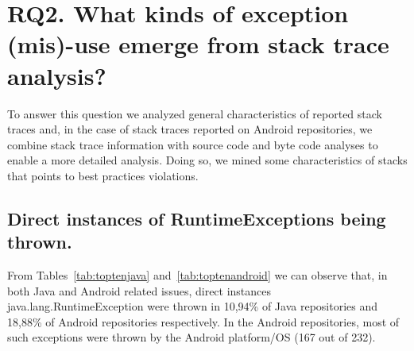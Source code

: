 \documentclass[conference]{IEEEtran}
\begin{document}


\section{RQ2.  What kinds of exception (mis)-use emerge from stack trace analysis? }

To answer this question we analyzed general characteristics of reported stack traces and, in the case of stack traces reported on Android repositories, we combine stack trace information with
source code and byte code analyses to enable a more detailed analysis.
Doing so, we mined some characteristics of stacks that points to best practices violations.

\subsection{Direct instances of RuntimeExceptions being thrown.}

From Tables~\ref{tab:toptenjava} and~\ref{tab:toptenandroid} we can observe that,
in both Java and Android related issues, direct instances
java.lang.RuntimeException were thrown  in 10,94\% of Java repositories and
18,88\% of Android repositories respectively. 
In the Android repositories, most of such exceptions  were  thrown by the Android 
platform/OS (167 out of 232).
\end{document}
